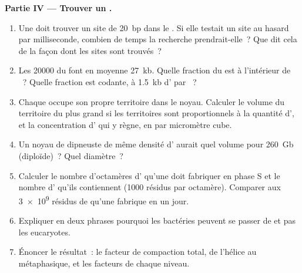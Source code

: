 \begin{problem}
\medskip
\noindent\textbf{Partie IV --- Trouver un .}
\begin{enumerate}[resume]
  \item Une  doit trouver un site de \qty{20}{bp} dans le
        . Si elle testait un site au hasard par milliseconde,
        combien de temps la recherche prendrait-elle~? Que dit cela de
        la façon dont les sites sont trouvés~?
  \item Les \qty{20000}{}  du  font en moyenne \qty{27}{kb}.
        Quelle fraction du  est à l'intérieur de ~? Quelle
        fraction est codante, à \qty{1.5}{kb} d' par ~?
  \item Chaque  occupe son propre territoire dans le noyau.
        Calculer le volume du territoire du plus grand  si
        les territoires sont proportionnels à la quantité d', et la
        concentration d' qui y règne, en  par
        micromètre cube.
  \item Un noyau de dipneuste de même densité d' aurait quel volume
        pour \qty{260}{Gb} (diploïde)~? Quel diamètre~?
  \item Calculer le nombre d'octamères d' qu'une  doit
        fabriquer en phase S et le nombre d' qu'ils
        contiennent (\qty{1000}{} résidus par octamère). Comparer aux
        \qty{3e9}{} résidus de  qu'une  fabrique en un
        jour.
  \item Expliquer en deux phrases pourquoi les bactéries peuvent se
        passer de  et pas les eucaryotes.
  \item Énoncer le résultat~: le facteur de compaction total, de
        l'hélice au  métaphasique, et les facteurs de chaque
        niveau.
\end{enumerate}
\end{problem}
